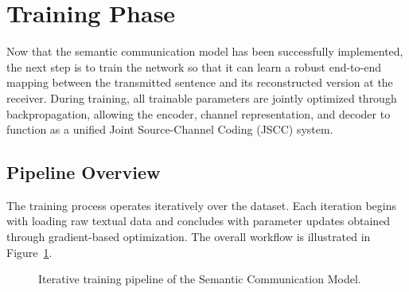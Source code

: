 \documentclass[twocolumn]{article}
\begin{document}
\setcounter{section}{29}
\setcounter{equation}{142}
\setcounter{figure}{31}
\setcounter{table}{12}

\section{Training Phase}

Now that the semantic communication model has been successfully implemented, the next step is to train the network so that it can learn a robust end-to-end mapping between the transmitted sentence and its reconstructed version at the receiver. During training, all trainable parameters are jointly optimized through backpropagation, allowing the encoder, channel representation, and decoder to function as a unified Joint Source-Channel Coding (JSCC) system.

\subsection{Pipeline Overview}

The training process operates iteratively over the dataset. Each iteration begins with loading raw textual data and concludes with parameter updates obtained through gradient-based optimization. The overall workflow is illustrated in Figure~\ref{fig:training_pipeline}.

\begin{figure}[!t]
\centering


\caption{Iterative training pipeline of the Semantic Communication Model.}
\label{fig:training_pipeline}
\end{figure}
\end{document}
